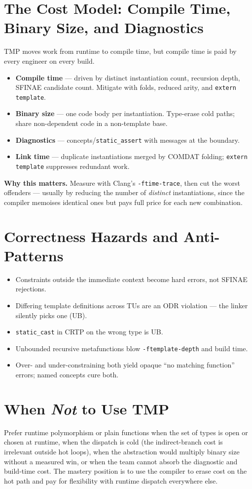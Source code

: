 \section{The Cost Model: Compile Time, Binary Size, and Diagnostics}

TMP moves work from runtime to compile time, but compile time is paid by every engineer on every build.

\begin{itemize}
\item \textbf{Compile time} --- driven by distinct instantiation count, recursion depth, SFINAE candidate count. Mitigate with folds, reduced arity, and \texttt{extern template}.
\item \textbf{Binary size} --- one code body per instantiation. Type-erase cold paths; share non-dependent code in a non-template base.
\item \textbf{Diagnostics} --- concepts/\texttt{static\_assert} with messages at the boundary.
\item \textbf{Link time} --- duplicate instantiations merged by COMDAT folding; \texttt{extern template} suppresses redundant work.
\end{itemize}

\textbf{Why this matters.} Measure with Clang's \texttt{-ftime-trace}, then cut the worst offenders --- usually by reducing the number of \emph{distinct} instantiations, since the compiler memoises identical ones but pays full price for each new combination.

\section{Correctness Hazards and Anti-Patterns}

\begin{itemize}
\item Constraints outside the immediate context become hard errors, not SFINAE rejections.
\item Differing template definitions across TUs are an ODR violation --- the linker silently picks one (UB).
\item \texttt{static\_cast} in CRTP on the wrong type is UB.
\item Unbounded recursive metafunctions blow \texttt{-ftemplate-depth} and build time.
\item Over- and under-constraining both yield opaque ``no matching function'' errors; named concepts cure both.
\end{itemize}

\section{When \emph{Not} to Use TMP}

Prefer runtime polymorphism or plain functions when the set of types is open or chosen at runtime, when the dispatch is cold (the indirect-branch cost is irrelevant outside hot loops), when the abstraction would multiply binary size without a measured win, or when the team cannot absorb the diagnostic and build-time cost. The mastery position is to use the compiler to erase cost on the hot path and pay for flexibility with runtime dispatch everywhere else.
